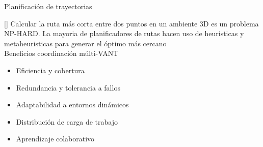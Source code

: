 \documentclass[
	11pt, %
]{beamer}
\begin{document}
\begin{frame}{Planificación de trayectorias}



  

  \cite{nphard}[] Calcular la ruta más corta entre dos puntos en un ambiente 3D es un problema NP-HARD. La mayoria de planificadores de rutas hacen uso de heuristicas y metaheuristicas para generar el óptimo más cercano \\
  \bigskip %
  Beneficios coordinación múlti-VANT
  \begin{itemize}
  \item Eficiencia y cobertura
  \item Redundancia y tolerancia a fallos
  \item Adaptabilidad a entornos dinámicos
  \item Distribución de carga de trabajo
  \item Aprendizaje colaborativo
  \end{itemize}
\end{frame}
\end{document}
